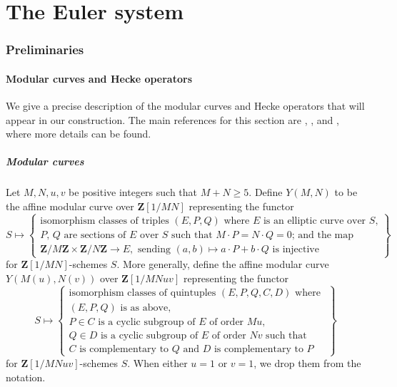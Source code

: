 \documentclass[10pt,letterpaper]{amsart}
\theoremstyle{plain}
\theoremstyle{definition}
\theoremstyle{definition}
\theoremstyle{plain}
\theoremstyle{plain}
\theoremstyle{plain}
\theoremstyle{remark}
\numberwithin{equation}{section}
\newcommand{\Z}{\mathbf{Z}}
\begin{document}
\newpage
\part{The Euler system}
\label{part:ES}
\section{Preliminaries}

\subsection{Modular curves and Hecke operators}
 We give a precise description of the modular curves and Hecke operators 
 that will appear in our construction. The main references for this section are \cite[\S 2]{kato}, \cite[\S 2]{BSV}, and \cite[\S 2]{ACR}, where more details can be found.
 
\subsubsection{Modular curves}Let $M,N,u,v$ be positive integers such that $M+N\ge 5$. Define $Y(M,N)$ to be the affine modular curve over $\Z[1/MN]$ representing the functor
\begin{equation*}
    S\mapsto\left\{
  \begin{array}{ll} \text{isomorphism classes of triples } (E,P,Q) \text{ where $E$ is an elliptic curve over $S$,} \\
  \text{$P$, $Q$ are sections of $E$ over $S$ such that $M\cdot P=N\cdot Q=0$; and the map} \\
  \Z/M\Z\times \Z/N\Z\rightarrow E, \text{ sending }(a,b)\mapsto a\cdot P+b\cdot Q\text{ is injective} \end{array} \right\}
\end{equation*}
for $\Z[1/MN]$-schemes $S$. More generally, define the affine modular curve $Y(M(u),N(v))$ over $\Z[1/MNuv]$ representing the functor
\begin{equation*}
  S\mapsto\left\{
  \begin{array}{ll} \text{isomorphism classes of quintuples } (E,P,Q,C,D) \text{ where }\\ \text{$(E,P,Q)$ is as above,} \\
  \text{$P\in C$ is a cyclic subgroup of $E$ of order $Mu$,} \\ \text{$Q\in D$ is a cyclic subgroup of $E$ of order $Nv$ such that} \\
   \text{$C$ is complementary to $Q$ and $D$ is complementary to $P$} \end{array} \right\}
\end{equation*}
for $\Z[1/MNuv]$-schemes $S$. When either $u=1$ or $v=1$, we drop them from the notation.
\end{document}
